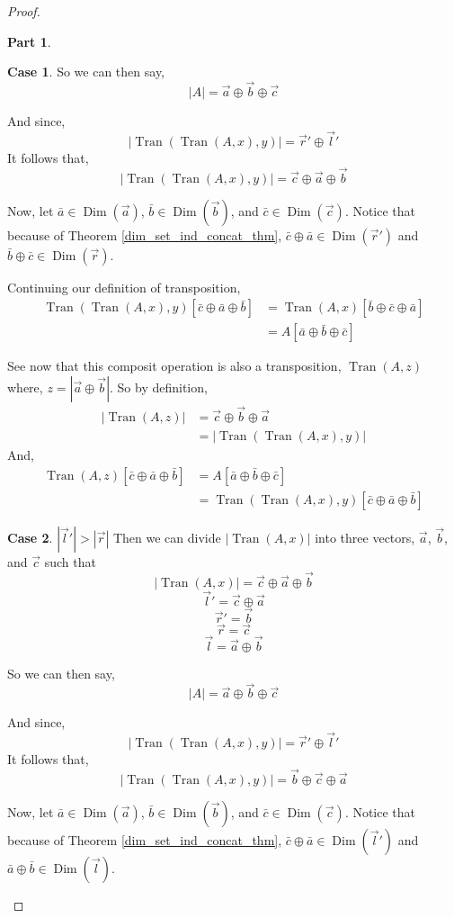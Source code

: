 \documentclass[12pt]{book}
\theoremstyle{plain}
\theoremstyle{definition}
\theoremstyle{ppart}
\newtheorem{ppart}{Part}
\theoremstyle{case}
\newtheorem{case}{Case}
\theoremstyle{solution}
\DeclareMathOperator{\Dim}{Dim}
\DeclareMathOperator{\Tran}{Tran}
\begin{document}
\begin{proof}
\begin{ppart}
\begin{case}
So we can then say,
\[ |A| = \vec{a} \oplus \vec{b} \oplus \vec{c} \]

And since,
\[ |\Tran(\Tran(A, x), y)| = \vec{r}' \oplus \vec{l}' \]
It follows that,
\[ |\Tran(\Tran(A, x), y)| = \vec{c} \oplus \vec{a} \oplus \vec{b} \]

Now, let $\bar{a} \in \Dim(\vec{a})$, $\bar{b} \in \Dim(\vec{b})$, and
$\bar{c} \in \Dim(\vec{c})$. Notice that because of Theorem 
\ref{dim_set_ind_concat_thm}, $\bar{c} \oplus \bar{a} \in \Dim(\vec{r}')$ and
$\bar{b} \oplus \bar{c} \in \Dim(\vec{r})$.

Continuing our definition of transposition,
\begin{align*}
  \Tran(\Tran(A, x), y)[\bar{c} \oplus \bar{a} \oplus \bar{b}]
  &=
  \Tran(A, x)[\bar{b} \oplus \bar{c} \oplus \bar{a}] \\
  &=
  A[\bar{a} \oplus \bar{b} \oplus \bar{c}]
\end{align*}

See now that this composit operation is also a transposition, $\Tran(A, z)$ where,
$z = |\vec{a} \oplus \vec{b}|$.
So by definition,
\begin{align*}
  |\Tran(A, z)|
  &=
  \vec{c} \oplus \vec{b} \oplus \vec{a} \\
  &=
  |\Tran(\Tran(A, x), y)|  
\end{align*}
And,
\begin{align*}
  \Tran(A, z)[\bar{c} \oplus \bar{a} \oplus \bar{b}]
  &=
  A[\bar{a} \oplus \bar{b} \oplus \bar{c}] \\
  &=
  \Tran(\Tran(A, x), y)[\bar{c} \oplus \bar{a} \oplus \bar{b}]
\end{align*}
\end{case}

\begin{case} $|\vec{l}'| > |\vec{r}|$
Then we can divide $|\Tran(A,x)|$ into three vectors, $\vec{a}$, $\vec{b}$, and $\vec{c}$
such that
\[ |\Tran(A,x)| = \vec{c} \oplus \vec{a} \oplus \vec{b} \]
\[ \vec{l}' = \vec{c} \oplus \vec{a} \]
\[ \vec{r}' = \vec{b} \]
\[ \vec{r} = \vec{c} \]
\[ \vec{l} = \vec{a} \oplus \vec{b} \]

So we can then say,
\[ |A| = \vec{a} \oplus \vec{b} \oplus \vec{c} \]

And since,
\[ |\Tran(\Tran(A, x), y)| = \vec{r}' \oplus \vec{l}' \]
It follows that,
\[ |\Tran(\Tran(A, x), y)| = \vec{b} \oplus \vec{c} \oplus \vec{a} \]

Now, let $\bar{a} \in \Dim(\vec{a})$, $\bar{b} \in \Dim(\vec{b})$, and
$\bar{c} \in \Dim(\vec{c})$. Notice that because of Theorem 
\ref{dim_set_ind_concat_thm}, $\bar{c} \oplus \bar{a} \in \Dim(\vec{l}')$ and
$\bar{a} \oplus \bar{b} \in \Dim(\vec{l})$.


\end{case}
\end{ppart}
\end{proof}
\end{document}
